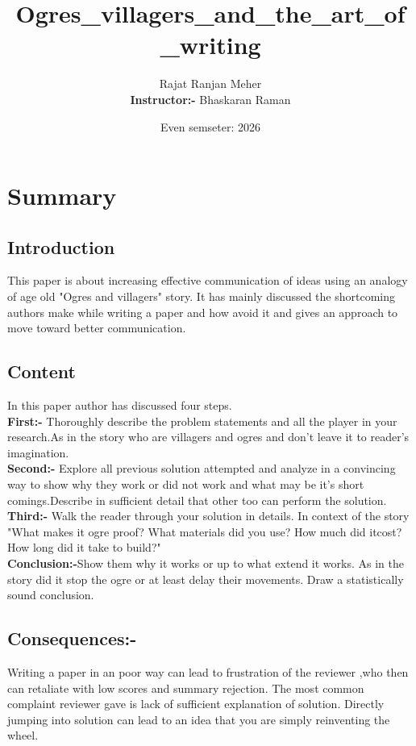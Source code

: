 \documentclass{article}
\title{Ogres\_villagers\_and\_the\_art\_of\_writing}
\author{Rajat Ranjan Meher\\[0.2cm]
\textbf{Instructor:-} Bhaskaran Raman   
}
\date{Even semseter: 2026}
\begin{document}
\maketitle

\section{Summary}

\subsection{Introduction}
This paper is about increasing effective communication of ideas using an analogy of age old "Ogres and villagers" story. It has mainly discussed the shortcoming authors make while writing a paper and how avoid it and gives an approach to move toward better communication.
\subsection{Content}
In this paper author has discussed four steps.\\

\textbf{First:-} Thoroughly describe the problem statements and all the player in your research.As in the story who are villagers and ogres and don't leave it to reader's imagination.\\

\textbf{Second:-} Explore all previous solution attempted and analyze in a convincing way to show why they work or did not work and what may be it's short comings.Describe in sufficient detail that other too can perform the solution.   \\

\textbf{Third:-} Walk the reader through your solution in details. In context of the story "What makes it ogre proof? What materials did you use? How much did itcost? How long did it take to build?"\\

 \textbf{Conclusion:-}Show them why it works or up to what extend it works. As in the story did it stop the ogre or at least delay their movements. Draw a statistically sound conclusion. \\

\subsection{Consequences:-}
Writing a paper in an poor way can lead to frustration of the reviewer ,who then can retaliate with low scores and summary rejection. The most common complaint reviewer gave is lack of sufficient explanation of solution. Directly jumping into solution can lead to an idea that you are simply reinventing the wheel. 
\end{document}
